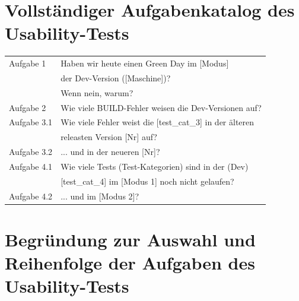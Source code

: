 \section{Vollständiger Aufgabenkatalog des Usability-Tests}
\label{Add:Usability_Test:Aufgabenkatalog}

\begin{table}[H]
    \centering
    \begin{tabular}{ll}
        Aufgabe 1   & Haben wir heute einen Green Day im [Modus] \\
                    & der Dev-Version ([Maschine])?\\
                    &  Wenn nein, warum?\\
        Aufgabe 2   & Wie viele BUILD-Fehler weisen die Dev-Versionen auf?\\
        Aufgabe 3.1 & Wie viele Fehler weist die [test\_cat\_3] in der älteren\\
                    & releasten Version [Nr] auf?\\
        Aufgabe 3.2 & ... und in der neueren [Nr]?\\
        Aufgabe 4.1 & Wie viele Tests (Test-Kategorien) sind in der (Dev)\\
                    & [test\_cat\_4] im [Modus 1] noch nicht gelaufen?\\
        Aufgabe 4.2 & ... und im [Modus 2]? \\
    \end{tabular}
\end{table}

\section{Begründung zur Auswahl und Reihenfolge der Aufgaben des Usability-Tests}
\label{Add:Usability_Test:Begündung_Filterung}


